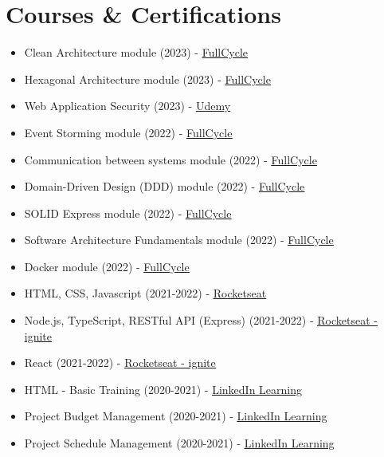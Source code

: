 \documentclass[11pt,a4paper,sans]{moderncv}
\begin{document}
\section{Courses \& Certifications}
 {\begin{itemize}[label=\textbullet]
	  \item Clean Architecture module (2023) - \underline{\color{blue}\href{https://fullcycle.com}{FullCycle}}
	  \item Hexagonal Architecture module (2023) - \underline{\color{blue}\href{https://fullcycle.com}{FullCycle}}
	  \item Web Application Security (2023) - \underline{\color{blue}\href{https://udemy.com}{Udemy}}
	  \item Event Storming module (2022) - \underline{\color{blue}\href{https://fullcycle.com}{FullCycle}}
	  \item Communication between systems module (2022) - \underline{\color{blue}\href{https://fullcycle.com}{FullCycle}}
	  \item Domain-Driven Design (DDD) module (2022) - \underline{\color{blue}\href{https://fullcycle.com}{FullCycle}}
	  \item SOLID Express module (2022) - \underline{\color{blue}\href{https://fullcycle.com}{FullCycle}}
	  \item Software Architecture Fundamentals module (2022) - \underline{\color{blue}\href{https://fullcycle.com}{FullCycle}}
	  \item Docker module (2022) - \underline{\color{blue}\href{https://fullcycle.com}{FullCycle}}
	  \item HTML, CSS, Javascript (2021-2022) - \underline{\color{blue}\href{https://rocketseat.com.br}{Rocketseat}}
	  \item Node.js, TypeScript, RESTful API (Express) (2021-2022) - \underline{\color{blue}\href{https://rocketseat.com.br}{Rocketseat - ignite}}
	  \item React (2021-2022) - \underline{\color{blue}\href{https://rocketseat.com.br}{Rocketseat - ignite}}
	  \item HTML - Basic Training (2020-2021) - \underline{\color{blue}\href{https://linkedin.com/learning}{LinkedIn Learning}}
	  \item Project Budget Management (2020-2021) - \underline{\color{blue}\href{https://linkedin.com/learning}{LinkedIn Learning}}
	  \item Project Schedule Management (2020-2021) - \underline{\color{blue}\href{https://linkedin.com/learning}{LinkedIn Learning}}

\end{itemize}}
\end{document}
